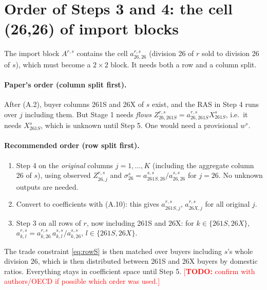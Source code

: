 \documentclass[11pt,a4paper]{article}
\theoremstyle{remark}
\theoremstyle{definition}
\newcommand{\sem}{{261S}}   %
\newcommand{\oth}{{26X}}    %
\newcommand{\agg}{{26}}     %
\newcommand{\todo}[1]{\textcolor{red}{[\textbf{TODO:} #1]}}
\begin{document}
\section{Order of Steps 3 and 4: the cell (\agg,\agg) of import blocks}\label{sec:order}

The import block $A^{r,s}$ contains the cell $a^{r,s}_{\agg,\agg}$ (division 26 of $r$ sold to division 26 of $s$),
which must become a $2\times 2$ block. It needs both a row and a column split.

\paragraph{Paper's order (column split first).} After (A.2), buyer columns \sem{} and \oth{} of $s$ exist, and the
RAS in Step 4 runs over $j$ including them. But Stage 1 needs \emph{flows}
$Z^{r,s}_{\agg,\sem} = a^{r,s}_{\agg,\sem}X^s_\sem$, i.e.\ it needs $X^s_\sem$, which is unknown until Step 5.
One would need a provisional $w^s$.

\paragraph{Recommended order (row split first).}
\begin{enumerate}[nosep]
  \item Step 4 on the \emph{original} columns $j=1,\dots,K$ (including the aggregate column \agg{} of $s$),
        using observed $Z^{r,s}_{\agg,j}$ and $\sigma^s_\agg = a^{s,s}_{\sem,\agg}/a^{s,s}_{\agg,\agg}$ for $j=\agg$.
        No unknown outputs are needed.
  \item Convert to coefficients with (A.10): this gives $a^{r,s}_{\sem,j}$, $a^{r,s}_{\oth,j}$ for all original $j$.
  \item Step 3 on all rows of $r$, now including \sem{} and \oth{}: for $k\in\{\sem,\oth\}$,
        $a^{r,s}_{k,l} = a^{r,s}_{k,\agg}\, a^{s,s}_{k,l}/a^{s,s}_{k,\agg}$, $l\in\{\sem,\oth\}$.
\end{enumerate}
The trade constraint \eqref{eq:rowS} is then matched over buyers including $s$'s whole division 26, which is then
distributed between \sem{} and \oth{} buyers by domestic ratios. Everything stays in coefficient space until
Step 5. \todo{confirm with authors/OECD if possible which order was used.}

\end{document}
